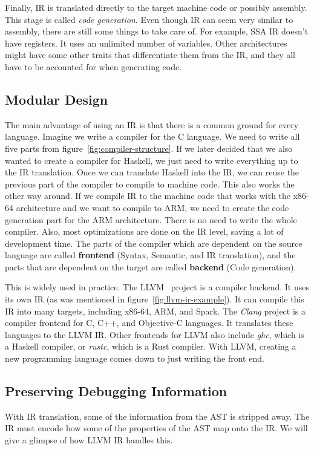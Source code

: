 Finally, IR is translated directly to the target machine code or possibly
assembly. This stage is called \textit{code generation}. Even though IR can
seem very similar to assembly, there are still some things to take care of. For
example, SSA IR doesn't have registers. It uses an unlimited number of
variables. Other architectures might have some other traits that differentiate
them from the IR, and they all have to be accounted for when generating code.

\subsection{Modular Design}
The main advantage of using an IR is that there is a common ground for every
language. Imagine we write a compiler for the C language. We need to write all
five parts from figure~\ref{fig:compiler-structure}. If we later decided that
we also wanted to create a compiler for Haskell, we just need to write
everything up to the IR translation. Once we can translate Haskell into the IR,
we can reuse the previous part of the compiler to compile to machine code. This
also works the other way around. If we compile IR to the machine code that
works with the x86-64 architecture and we want to compile to ARM, we need to
create the code generation part for the ARM architecture. There is no need to
write the whole compiler. Also, most optimizations are done on the IR level,
saving a lot of development time. The parts of the compiler which are dependent
on the source language are called \textbf{frontend} (Syntax, Semantic, and IR
translation), and the parts that are dependent on the target are called
\textbf{backend} (Code generation).

This is widely used in practice. The LLVM~\cite{llvm} project is a compiler
backend. It uses its own IR (as was mentioned in
figure~\ref{fig:llvm-ir-example}). It can compile this IR into many targets,
including x86-64, ARM, and Spark. The \textit{Clang} project is a compiler
frontend for C, C++, and Objective-C languages. It translates these languages
to the LLVM IR. Other frontends for LLVM also include \textit{ghc}, which is a
Haskell compiler, or \textit{rustc}, which is a Rust compiler. With LLVM,
creating a new programming language comes down to just writing the front end.

\subsection{Preserving Debugging Information}
With IR translation, some of the information from the AST is stripped away. The
IR must encode how some of the properties of the AST map onto the IR. We will
give a glimpse of how LLVM IR handles this.

